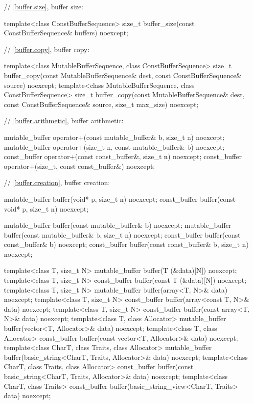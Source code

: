\begin{codeblock}
{{{  // \ref{buffer.size}, buffer size:

  template<class ConstBufferSequence>
    size_t buffer_size(const ConstBufferSequence& buffers) noexcept;

  // \ref{buffer.copy}, buffer copy:

  template<class MutableBufferSequence, class ConstBufferSequence>
    size_t buffer_copy(const MutableBufferSequence& dest,
                       const ConstBufferSequence& source) noexcept;
  template<class MutableBufferSequence, class ConstBufferSequence>
    size_t buffer_copy(const MutableBufferSequence& dest,
                       const ConstBufferSequence& source,
                       size_t max_size) noexcept;

  // \ref{buffer.arithmetic}, buffer arithmetic:

  mutable_buffer operator+(const mutable_buffer& b, size_t n) noexcept;
  mutable_buffer operator+(size_t n, const mutable_buffer& b) noexcept;
  const_buffer operator+(const const_buffer&, size_t n) noexcept;
  const_buffer operator+(size_t, const const_buffer&) noexcept;

  // \ref{buffer.creation}, buffer creation:

  mutable_buffer buffer(void* p, size_t n) noexcept;
  const_buffer buffer(const void* p, size_t n) noexcept;

  mutable_buffer buffer(const mutable_buffer& b) noexcept;
  mutable_buffer buffer(const mutable_buffer& b, size_t n) noexcept;
  const_buffer buffer(const const_buffer& b) noexcept;
  const_buffer buffer(const const_buffer& b, size_t n) noexcept;

  template<class T, size_t N>
    mutable_buffer buffer(T (&data)[N]) noexcept;
  template<class T, size_t N>
    const_buffer buffer(const T (&data)[N]) noexcept;
  template<class T, size_t N>
    mutable_buffer buffer(array<T, N>& data) noexcept;
  template<class T, size_t N>
    const_buffer buffer(array<const T, N>& data) noexcept;
  template<class T, size_t N>
    const_buffer buffer(const array<T, N>& data) noexcept;
  template<class T, class Allocator>
    mutable_buffer buffer(vector<T, Allocator>& data) noexcept;
  template<class T, class Allocator>
    const_buffer buffer(const vector<T, Allocator>& data) noexcept;
  template<class CharT, class Traits, class Allocator>
    mutable_buffer buffer(basic_string<CharT, Traits, Allocator>& data) noexcept;
  template<class CharT, class Traits, class Allocator>
    const_buffer buffer(const basic_string<CharT, Traits, Allocator>& data) noexcept;
  template<class CharT, class Traits>
    const_buffer buffer(basic_string_view<CharT, Traits> data) noexcept;

}}}
\end{codeblock}
